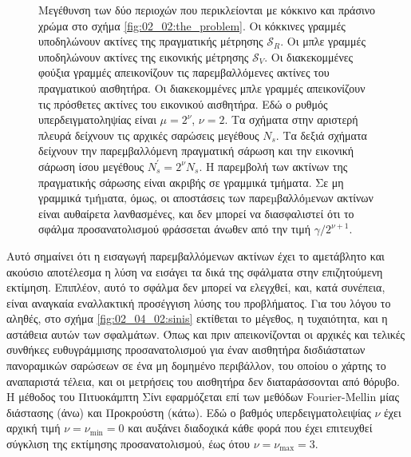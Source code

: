 \begin{figure}[h]\centering
  \vspace{0.5cm}
  
  \vspace{1.0cm}
  \caption{\small Μεγέθυνση των δύο περιοχών που περικλείονται με κόκκινο
           και πράσινο χρώμα στο σχήμα \ref{fig:02_02:the_problem}. Οι κόκκινες
           γραμμές υποδηλώνουν ακτίνες της πραγματικής μέτρησης $\mathcal{S}_R$.
           Oι μπλε γραμμές υποδηλώνουν ακτίνες της εικονικής μέτρησης $\mathcal{S}_V$.
           Οι διακεκομμένες φούξια γραμμές απεικονίζουν τις παρεμβαλλόμενες
           ακτίνες του πραγματικού αισθητήρα. Οι διακεκομμένες μπλε γραμμές
           απεικονίζουν τις πρόσθετες ακτίνες του εικονικού αισθητήρα.
           Εδώ ο ρυθμός υπερδειγματοληψίας είναι $\mu = 2^\nu$, $\nu = 2$.
           Τα σχήματα στην αριστερή πλευρά δείχνουν τις αρχικές σαρώσεις
           μεγέθους $N_s$. Τα δεξιά σχήματα δείχνουν την παρεμβαλλόμενη
           πραγματική σάρωση και την εικονική σάρωση ίσου μεγέθους $N_s^\prime
           = 2^\nu N_s$. Η παρεμβολή των ακτίνων της πραγματικής σάρωσης είναι
           ακριβής σε γραμμικά τμήματα. Σε μη γραμμικά τµήµατα, όμως, οι
           αποστάσεις των παρεµβαλλόµενων ακτίνων είναι αυθαίρετα λανθασμένες,
           και δεν μπορεί να διασφαλιστεί ότι το σφάλμα προσανατολισμού
           φράσσεται άνωθεν από την τιμή $\gamma/2^{\nu+1}$. }
  \label{fig:oversampling_goes_wrong}
\end{figure}

Αυτό σημαίνει ότι η εισαγωγή παρεμβαλλόμενων ακτίνων έχει το αμετάβλητο και
ακούσιο αποτέλεσμα η λύση να εισάγει τα δικά της σφάλματα στην επιζητούμενη
εκτίμηση. Επιπλέον, αυτό το σφάλμα δεν μπορεί να ελεγχθεί, και, κατά συνέπεια,
είναι αναγκαία εναλλακτική προσέγγιση λύσης του προβλήματος. Για του λόγου το
αληθές, στο σχήμα \ref{fig:02_04_02:sinis} εκτίθεται το μέγεθος, η τυχαιότητα,
και η αστάθεια αυτών των σφαλμάτων. Όπως και πριν απεικονίζονται οι αρχικές και
τελικές συνθήκες ευθυγράμμισης προσανατολισμού για έναν αισθητήρα δισδιάστατων
πανοραμικών σαρώσεων σε ένα μη δομημένο περιβάλλον, του οποίου ο χάρτης το
αναπαριστά τέλεια, και οι μετρήσεις του αισθητήρα δεν διαταράσσονται από
θόρυβο. H μέθοδος του Πιτυοκάμπτη Σίνι εφαρμόζεται επί των μεθόδων
Fourier-Mellin μίας διάστασης (άνω) και Προκρούστη (κάτω). Εδώ ο βαθμός
υπερδειγματολειψίας $\nu$ έχει αρχική τιμή $\nu = \nu_{\min} = 0$ και αυξάνει
διαδοχικά κάθε φορά που έχει επιτευχθεί σύγκλιση της εκτίμησης προσανατολισμού,
έως ότου $\nu = \nu_{\max} = 3$.

